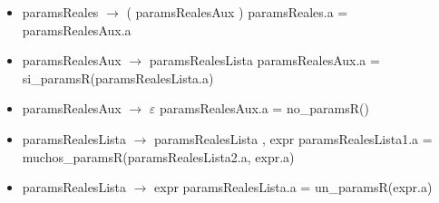 \documentclass[11pt]{article}
\begin{document}
\begin{itemize}
            \item paramsReales $\rightarrow$ ( paramsRealesAux )
                \subitem paramsReales.a = paramsRealesAux.a
            \item paramsRealesAux $\rightarrow$ paramsRealesLista
                \subitem paramsRealesAux.a = si\_paramsR(paramsRealesLista.a)
            \item paramsRealesAux $\rightarrow$ $\varepsilon$
                \subitem paramsRealesAux.a = no\_paramsR()
            \item paramsRealesLista $\rightarrow$ paramsRealesLista , expr
                \subitem paramsRealesLista1.a = muchos\_paramsR(paramsRealesLista2.a, expr.a)
            \item paramsRealesLista $\rightarrow$ expr
                \subitem paramsRealesLista.a = un\_paramsR(expr.a)
        \end{itemize}
        \ 
\end{document}
